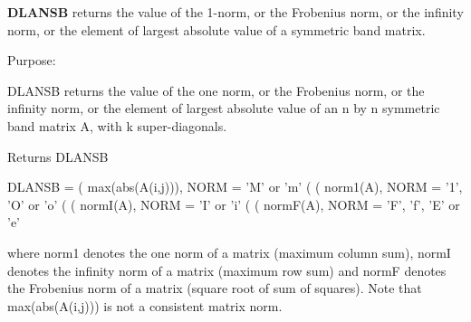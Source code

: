 {\bfseries D\+L\+A\+N\+S\+B} returns the value of the 1-\/norm, or the Frobenius norm, or the infinity norm, or the element of largest absolute value of a symmetric band matrix. 

 \begin{DoxyParagraph}{Purpose\+: }
\begin{DoxyVerb} DLANSB  returns the value of the one norm,  or the Frobenius norm, or
 the  infinity norm,  or the element of  largest absolute value  of an
 n by n symmetric band matrix A,  with k super-diagonals.\end{DoxyVerb}

\end{DoxyParagraph}
\begin{DoxyReturn}{Returns}
D\+L\+A\+N\+S\+B \begin{DoxyVerb}    DLANSB = ( max(abs(A(i,j))), NORM = 'M' or 'm'
             (
             ( norm1(A),         NORM = '1', 'O' or 'o'
             (
             ( normI(A),         NORM = 'I' or 'i'
             (
             ( normF(A),         NORM = 'F', 'f', 'E' or 'e'

 where  norm1  denotes the  one norm of a matrix (maximum column sum),
 normI  denotes the  infinity norm  of a matrix  (maximum row sum) and
 normF  denotes the  Frobenius norm of a matrix (square root of sum of
 squares).  Note that  max(abs(A(i,j)))  is not a consistent matrix norm.\end{DoxyVerb}
 
\end{DoxyReturn}

